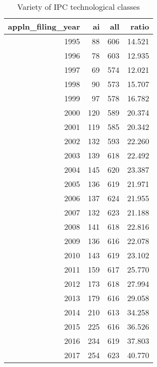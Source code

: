 \begin{table}[ht]
\centering
\begin{tabular}{rrrr}
  \hline
appln\_filing\_year & ai & all & ratio \\ 
  \hline
1995 &   88 &  606 & 14.521 \\ 
  1996 &   78 &  603 & 12.935 \\ 
  1997 &   69 &  574 & 12.021 \\ 
  1998 &   90 &  573 & 15.707 \\ 
  1999 &   97 &  578 & 16.782 \\ 
  2000 &  120 &  589 & 20.374 \\ 
  2001 &  119 &  585 & 20.342 \\ 
  2002 &  132 &  593 & 22.260 \\ 
  2003 &  139 &  618 & 22.492 \\ 
  2004 &  145 &  620 & 23.387 \\ 
  2005 &  136 &  619 & 21.971 \\ 
  2006 &  137 &  624 & 21.955 \\ 
  2007 &  132 &  623 & 21.188 \\ 
  2008 &  141 &  618 & 22.816 \\ 
  2009 &  136 &  616 & 22.078 \\ 
  2010 &  143 &  619 & 23.102 \\ 
  2011 &  159 &  617 & 25.770 \\ 
  2012 &  173 &  618 & 27.994 \\ 
  2013 &  179 &  616 & 29.058 \\ 
  2014 &  210 &  613 & 34.258 \\ 
  2015 &  225 &  616 & 36.526 \\ 
  2016 &  234 &  619 & 37.803 \\ 
  2017 &  254 &  623 & 40.770 \\ 
   \hline
\end{tabular}
\caption{Variety of IPC technological classes} 
\end{table}
